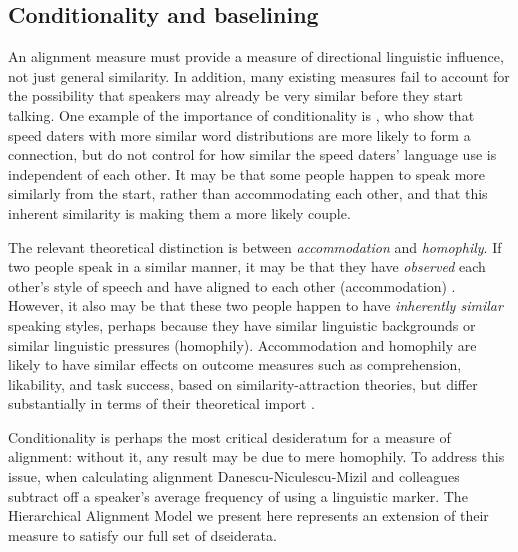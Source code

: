 \documentclass{acm_proc_article-sp}
\begin{document}

\subsection{Conditionality and baselining} 

An alignment measure must provide a measure of directional linguistic influence, not just general similarity. In addition, many existing measures fail to account for the possibility that speakers may already be very similar before they start talking.  One example of the importance of conditionality is \cite{IrelandEtAl2011}, who show that speed daters with more similar word distributions are more likely to form a connection, but do not control for how similar the speed daters' language use is independent of each other.  It may be that some people happen to speak more similarly from the start, rather than accommodating each other, and that this inherent similarity is making them a more likely couple.

The relevant theoretical distinction is between \textit{accommodation} and \textit{homophily}.  If two people speak in a similar manner, it may be that they have \emph{observed} each other's style of speech and have aligned to each other (accommodation) \cite{DNMGamonDumais2011}. However, it also may be that these two people happen to have \emph{inherently similar} speaking styles, perhaps because they have similar linguistic backgrounds or similar linguistic pressures (homophily). Accommodation and homophily are likely to have similar effects on outcome measures such as comprehension, likability, and task success, based on similarity-attraction theories, but differ substantially in terms of their theoretical import \cite{Byrne1969,Triandis1960,GilesSmith1979}.  

Conditionality is perhaps the most critical desideratum for a measure of alignment: without it, any result may be due to mere homophily. To address this issue, when calculating alignment Danescu-Niculescu-Mizil and colleagues \cite{DNMGamonDumais2011,DNMLee2011,DNMEtAl2012} subtract off a speaker's average frequency of using a linguistic marker. The Hierarchical Alignment Model we present here represents an extension of their measure to satisfy our full set of dseiderata. 

\end{document}
